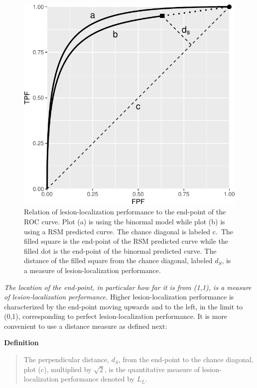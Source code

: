 \documentclass[
]{book}
\begin{document}
\begin{figure}
\centering
\includegraphics{10-rsm-search-classification_files/figure-latex/rsm-search-classification-performance-from-roc-curve-1.pdf}
\caption{\label{fig:rsm-search-classification-performance-from-roc-curve}Relation of lesion-localization performance to the end-point of the ROC curve. Plot (a) is using the binormal model while plot (b) is using a RSM predicted curve. The chance diagonal is labeled c.~The filled square is the end-point of the RSM predicted curve while the filled dot is the end-point of the binormal predicted curve. The distance of the filled square from the chance diagonal, labeled \(d_S\), is a measure of lesion-localization performance.}
\end{figure}

\emph{The location of the end-point, in particular how far it is from (1,1), is a measure of lesion-localization performance.} Higher lesion-localization performance is characterized by the end-point moving upwards and to the left, in the limit to (0,1), corresponding to perfect lesion-localization performance. It is more convenient to use a distance measure as defined next:

\textbf{Definition}

\begin{quote}
The perpendicular distance, \(d_S\), from the end-point to the chance diagonal, plot (c), multiplied by \(\sqrt{2}\), is the quantitative measure of lesion-localization performance denoted by \(L_L\).
\end{quote}
\end{document}

